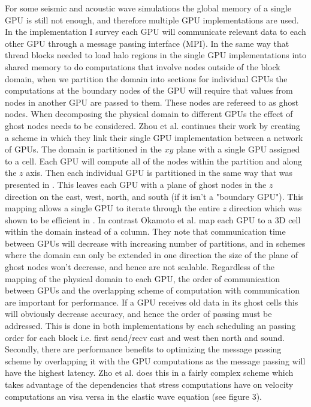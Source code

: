 \documentclass[conference]{IEEEtran}
\begin{document}
For some seismic and acoustic wave simulations the global memory of a single GPU is still not enough, and therefore multiple GPU implementations are used. In the implementation I survey each GPU will communicate relevant data to each other GPU through a message passing interface (MPI). In the same way that thread blocks needed to load halo regions in the single GPU implementations into shared memory to do computations that involve nodes outside of the block domain, when we partition the domain into sections for individual GPUs the computations at the boundary nodes of the GPU will require that values from nodes in another GPU are passed to them\cite{Okamoto}. These nodes are refereed to as ghost nodes. When decomposing the physical domain to different GPUs the effect of ghost nodes needs to be considered. Zhou et al.\cite{Zhou} continues their work by creating a scheme in which they link their single GPU implementation between a network of GPUs. The domain is partitioned in the $xy$ plane with a single GPU assigned to a cell. Each GPU will compute all of the nodes within the partition and along the $z$ axis. Then each individual GPU is partitioned in the same way that was presented in \cite{Zhou1}. This leaves each GPU with a plane of ghost nodes in the $z$ direction on the east, west, north, and south (if it isn't a "boundary GPU"). This mapping allows a single GPU to iterate through the entire $z$ direction which was shown to be efficient in \cite{Zhou1}. In contrast Okamoto et al. \cite{Okamoto} map each GPU to a 3D cell within the domain instead of a column. They note that communication time between GPUs will decrease with increasing number of partitions, and in schemes where the domain can only be extended in one direction the size of the plane of ghost nodes won't decrease, and hence are not scalable. Regardless of the mapping of the physical domain to each GPU, the order of communication between GPUs and the overlapping scheme of computation with communication are important for performance. If a GPU receives old data in its ghost cells this will obviously decrease accuracy, and hence the order of passing must be addressed. This is done in both implementations by each scheduling an passing order for each block i.e. first send/recv east and west then north and sound. Secondly, there are performance benefits to optimizing the message passing scheme by overlapping it with the GPU computations as the message passing will have the highest latency. Zho et al.\cite{Zhou} does this in a fairly complex scheme which takes advantage of the dependencies that stress computations have on velocity computations an visa versa in the elastic wave equation (see figure 3).
\end{document}

